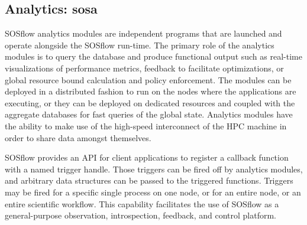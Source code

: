 \subsection{Analytics: sosa} %
%
SOSflow analytics modules are independent programs that are launched
and operate alongside the SOSflow run-time.
%
The primary role of the analytics modules is to query the database and
produce functional output such as real-time visualizations of
performance metrics, feedback to facilitate optimizations, or global
resource bound calculation and policy enforcement.
%
%
%
The modules can be deployed in a distributed fashion to run on the nodes
where the applications are executing, or they can be deployed on dedicated
resources and coupled with the aggregate databases for fast queries
of the global state.
%
Analytics modules have the ability to make use of the high-speed
interconnect of the HPC machine in order to share data amongst themselves.
%
\par
%
SOSflow provides an API for client applications to register
a callback function with a named trigger handle.
%
Those triggers can be fired off by analytics modules, and arbitrary
data structures can be passed to the triggered functions.
%
Triggers may be fired for a specific single process on one node,
or for an entire node, or an entire scientific workflow.
%
This capability facilitates the use of SOSflow as a general-purpose observation,
introspection, feedback, and control platform.
